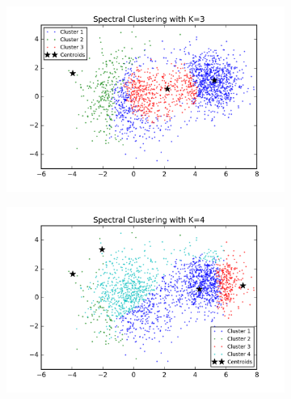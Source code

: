 \begin{figure}[htb]
        \centering
        \begin{subfigure}[b]{0.475\textwidth}
            \centering
            \includegraphics[width=\textwidth]{./figures/clustering_spectral_3.png}
        \end{subfigure}
        \hfill
        \begin{subfigure}[b]{0.475\textwidth}  
            \centering 
            \includegraphics[width=\textwidth]{./figures/clustering_spectral_4.png}
        \end{subfigure}
        \begin{subfigure}[b]{0.475\textwidth}  
            \centering 

\end{subfigure}
\end{figure}
